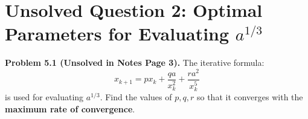 \documentclass[11pt,a4paper]{article}
\numberwithin{equation}{section}
\begin{document}
\section{Unsolved Question 2: Optimal Parameters for Evaluating \texorpdfstring{$a^{1/3}$}{a^(1/3)}}

\begin{thmbox}
\textbf{Problem 5.1 (Unsolved in Notes Page 3).}
The iterative formula:
\begin{equation}
    x_{k+1} = p x_k + \frac{qa}{x_k^2} + \frac{r a^2}{x_k^5}
\end{equation}
is used for evaluating $a^{1/3}$. Find the values of $p, q, r$ so that it converges with the \textbf{maximum rate of convergence}.
\end{thmbox}
\end{document}
